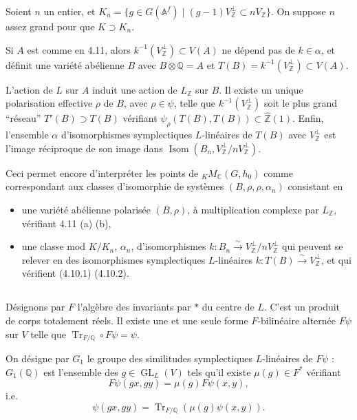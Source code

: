 \documentclass[11pt]{amsart}
\theoremstyle{plain}
\theoremstyle{definition}
\DeclareMathOperator{\Isom}{Isom}
\DeclareMathOperator{\GL}{GL}
\DeclareMathOperator{\Tr}{Tr}
\newcommand{\ZZ}{\mathbb{Z}}
\newcommand{\QQ}{\mathbb{Q}}
\newcommand{\AAf}{\mathbb{A}^f}
\newcommand{\MC}{M_{\mathbb{C}}}
\begin{document}
Soient $n$ un entier, et $K_n = \{g \in G(\AAf) \mid (g-1)V_{\ZZ}^\perp \subset n V_{\ZZ}\}$. On suppose $n$ assez grand pour que $K \supset K_n$.

Si $A$ est comme en 4.11, alors $k^{-1}(V_{\ZZ}^\perp) \subset V(A)$ ne d\'epend pas de $k \in \alpha$, et d\'efinit une vari\'et\'e ab\'elienne $B$ avec $B \otimes \QQ = A$ et $T(B) = k^{-1}(V_{\ZZ}^\perp) \subset V(A)$.

L'action de $L$ sur $A$ induit une action de $L_{\ZZ}$ sur $B$. Il existe un unique polarisation effective $\rho$ de $B$, avec $\rho \in \psi$, telle que $k^{-1}(V_{\ZZ}^\perp)$ soit le plus grand ``r\'eseau'' $T'(B) \supset T(B)$ v\'erifiant $\psi_\rho(T(B), T(B)) \subset \hat{\ZZ}(1)$. Enfin, l'ensemble $\alpha$ d'isomorphismes symplectiques $L$-lin\'eaires de $T(B)$ avec $V_{\ZZ}^\perp$ est l'image r\'eciproque de son image dans $\Isom(B_n, V_{\ZZ}^\perp / n V_{\ZZ}^\perp)$.

Ceci permet encore d'interpr\'eter les points de ${}_K \MC(G,h_0)$ comme correspondant aux classes d'isomorphie de syst\`emes $(B, \rho, \rho, \alpha_n)$ consistant en
\begin{itemize}
\item[(a)] une vari\'et\'e ab\'elienne polaris\'ee $(B, \rho)$, \`a multiplication complexe par $L_{\ZZ}$, v\'erifiant 4.11 (a) (b),
\item[(b)] une classe mod $K/K_n$, $\alpha_n$, d'isomorphismes $k : B_n \xrightarrow{\sim} V_{\ZZ}^\perp / n V_{\ZZ}^\perp$ qui peuvent se relever en des isomorphismes symplectiques $L$-lin\'eaires $k : T(B) \xrightarrow{\sim} V_{\ZZ}^\perp$, et qui v\'erifient (4.10.1) (4.10.2).
\end{itemize}

\subsection{}

D\'esignons par $F$ l'alg\`ebre des invariants par $*$ du centre de $L$. C'est un produit de corps totalement r\'eels. Il existe une et une seule forme $F$-bilin\'eaire altern\'ee $F\psi$ sur $V$ telle que $\Tr_{F/\QQ} \circ F\psi = \psi$.

On d\'esigne par $G_1$ le groupe des similitudes symplectiques $L$-lin\'eaires de $F\psi$ : $G_1(\QQ)$ est l'ensemble des $g \in \GL_L(V)$ tels qu'il existe $\mu(g) \in F^*$ v\'erifiant
\begin{equation}\label{eq:4.13.1}
F\psi(gx, gy) = \mu(g) F\psi(x,y),
\end{equation}
i.e.
\begin{equation}\label{eq:4.13.2}
\psi(gx, gy) = \Tr_{F/\QQ}(\mu(g) \psi(x,y)).
\end{equation}
\end{document}

